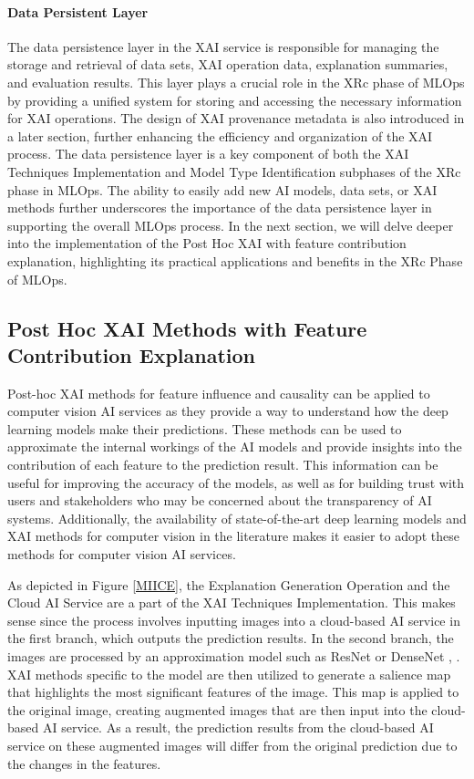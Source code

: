 \documentclass[conference]{IEEEtran}
\begin{document}
\paragraph{Data Persistent Layer} The data persistence layer in the XAI service is responsible for managing the storage and retrieval of data sets, XAI operation data, explanation summaries, and evaluation results. This layer plays a crucial role in the XRc phase of MLOps by providing a unified system for storing and accessing the necessary information for XAI operations. The design of XAI provenance metadata is also introduced in a later section, further enhancing the efficiency and organization of the XAI process. The data persistence layer is a key component of both the XAI Techniques Implementation and Model Type Identification subphases of the XRc phase in MLOps. The ability to easily add new AI models, data sets, or XAI methods further underscores the importance of the data persistence layer in supporting the overall MLOps process.
In the next section, we will delve deeper into the implementation of the Post Hoc XAI with feature contribution explanation, highlighting its practical applications and benefits in the XRc Phase of MLOps.
\subsection{Post Hoc XAI Methods with Feature Contribution Explanation}
Post-hoc XAI methods for feature influence and causality can be applied to computer vision AI services as they provide a way to understand how the deep learning models make their predictions. These methods can be used to approximate the internal workings of the AI models and provide insights into the contribution of each feature to the prediction result. This information can be useful for improving the accuracy of the models, as well as for building trust with users and stakeholders who may be concerned about the transparency of AI systems. Additionally, the availability of state-of-the-art deep learning models and XAI methods for computer vision in the literature makes it easier to adopt these methods for computer vision AI services.

As depicted in Figure \ref{MIICE}, the Explanation Generation Operation and the Cloud AI Service are a part of the XAI Techniques Implementation. This makes sense since the process involves inputting images into a cloud-based AI service in the first branch, which outputs the prediction results. In the second branch, the images are processed by an approximation model such as ResNet or DenseNet \cite{resnet} , \cite{densnet}. XAI methods specific to the model \cite{Ramp} are then utilized to generate a salience map that highlights the most significant features of the image. This map is applied to the original image, creating augmented images that are then input into the cloud-based AI service. As a result, the prediction results from the cloud-based AI service on these augmented images will differ from the original prediction due to the changes in the features.
\end{document}
